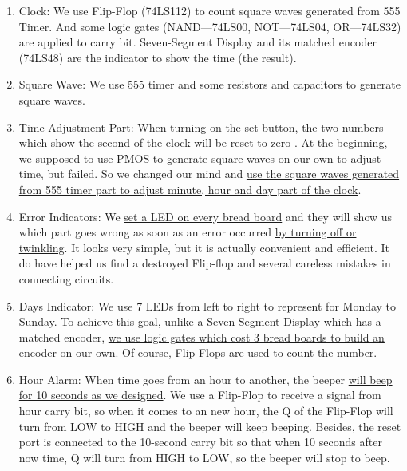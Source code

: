 \documentclass[12pt]{article}
\begin{document}
\begin{enumerate}
	\item Clock: We use Flip-Flop (74LS112) to count square waves generated from 555 Timer. And some logic gates (NAND—74LS00, NOT—74LS04, OR—74LS32) are applied to carry bit. Seven-Segment Display and its matched encoder (74LS48) are the indicator to show the time (the result).
	\item Square Wave: We use 555 timer and some resistors and capacitors to generate square waves.
	\item Time Adjustment Part: When turning on the set button, \uline{the two numbers which show the second of the clock will be reset to zero} . At the beginning, we supposed to use PMOS to generate square waves on our own to adjust time, but failed. So we changed our mind and \uline {use the square waves generated from 555 timer part to adjust minute, hour and day part of the clock}.
	\item Error Indicators: We \uline{set a LED on every bread board} and they will show us which part goes wrong as soon as an error occurred \uline{by turning off or twinkling}. It looks very simple, but it is actually convenient and efficient. It do have helped us find a destroyed Flip-flop and several careless mistakes in connecting circuits.
	\item Days Indicator: We use 7 LEDs from left to right to represent for Monday to Sunday. To achieve this goal, unlike a Seven-Segment Display which has a matched encoder, \uline{we use logic gates which cost 3 bread boards to build an encoder on our own}. Of course, Flip-Flops are used to count the number.
	\item Hour Alarm: When time goes from an hour to another, the beeper \uline{will beep for 10 seconds as we designed}. We use a Flip-Flop to receive a signal from hour carry bit, so when it comes to an new hour, the Q of the Flip-Flop will turn from LOW to HIGH and the beeper will keep beeping. Besides, the reset port is connected to the 10-second carry bit so that when 10 seconds after now time, Q will turn from HIGH to LOW, so the beeper will stop to beep.
\end{enumerate}
\end{document}
